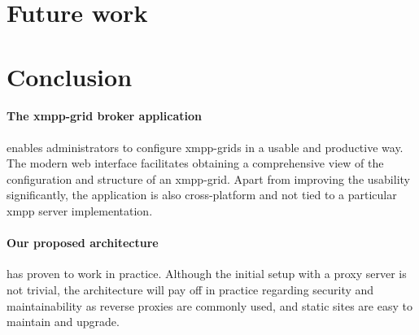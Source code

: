 




\section{Future work}

\section{Conclusion}
\paragraph{The \gls{xmpp-grid} \gls{broker} application} enables administrators to configure \glspl{xmpp-grid} in a usable and productive way.
The modern web interface facilitates obtaining a comprehensive view of the configuration and structure of an \gls{xmpp-grid}.
Apart from improving the usability significantly, the application is also cross-platform and not tied to a particular \gls{xmpp} server implementation.

\paragraph{Our proposed architecture} has proven to work in practice.
Although the initial setup with a proxy server is not trivial, the architecture will pay off in practice regarding security and maintainability as reverse proxies are commonly used, and static sites are easy to maintain and upgrade.

